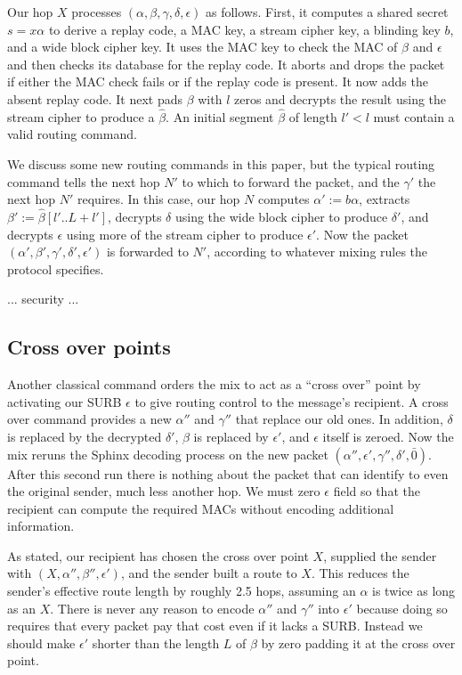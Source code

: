 \documentclass[twoside,letterpaper]{llncs}
\begin{document}
Our hop $X$ processes $(\alpha,\beta,\gamma,\delta,\epsilon)$
as follows.  First, it computes a shared secret $s = x \alpha$ to
derive a replay code, a MAC key, a stream cipher key, 
 a blinding key $b$, and a wide block cipher key. 
It uses the MAC key to check the MAC of $\beta$ and $\epsilon$ and
 then checks its database for the replay code.
It aborts and drops the packet if either the MAC check fails or
 if the replay code is present.  It now adds the absent replay code.
It next pads $\beta$ with $l$ zeros and decrypts the result
 using the stream cipher to produce a $\hat\beta$.
An initial segment $\hat\beta$ of length $l' < l$ must contain
a valid routing command.  

We discuss some new routing commands in this paper, but the typical
routing command tells the next hop $N'$ to which to forward the
packet, and the $\gamma'$ the next hop $N'$ requires. 
In this case, our hop $N$ computes $\alpha' := b \alpha$,
extracts $\beta' := \hat\beta[l'..L+l']$,
decrypts $\delta$ using the wide block cipher
 to produce $\delta'$, and
decrypts $\epsilon$ using more of the stream cipher
 to produce $\epsilon'$.
Now the packet $(\alpha',\beta',\gamma',\delta',\epsilon')$ is
forwarded to $N'$,
 according to whatever mixing rules the protocol specifies.

... security ...

\subsection{Cross over points}

Another classical command orders the mix to act as a ``cross over''
point by activating our SURB $\epsilon$ to give routing control to
the message's recipient.  A cross over command provides a new
$\alpha''$ and $\gamma''$ that replace our old ones.  
In addition, $\delta$ is replaced by the decrypted $\delta'$, 
$\beta$ is replaced by $\epsilon'$, and $\epsilon$ itself is zeroed.
Now the mix reruns the Sphinx decoding process on the new packet
$(\alpha'',\epsilon',\gamma'',\delta',\bar{0})$.  
After this second run there is nothing about the packet that can
identify to even the original sender, much less another hop.
We must zero $\epsilon$ field so that the recipient can compute
the required MACs without encoding additional information. 

As stated, our recipient has chosen the cross over point $X$,
supplied the sender with $(X,\alpha'',\beta'',\epsilon')$,
and the sender built a route to $X$.  This reduces the sender's
effective route length by roughly 2.5 hops, assuming an $\alpha$
is twice as long as an $X$.  There is never any reason to encode
$\alpha''$ and $\gamma''$ into $\epsilon'$ because doing so
requires that every packet pay that cost even if it lacks a SURB.
Instead we should make $\epsilon'$ shorter than the length $L$ of
$\beta$ by zero padding it at the cross over point. 
\end{document}
